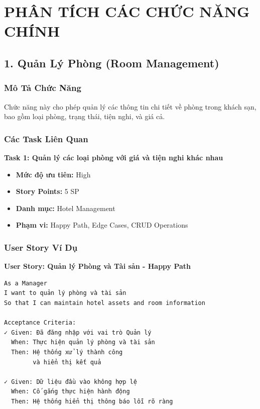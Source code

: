 \documentclass[12pt, a4paper]{report}
\begin{document}
\newpage

\chapter{PHÂN TÍCH CÁC CHỨC NĂNG CHÍNH}

\section{1. Quản Lý Phòng (Room Management)}

\subsection{Mô Tả Chức Năng}

Chức năng này cho phép quản lý các thông tin chi tiết về phòng trong khách sạn, bao gồm loại phòng, trạng thái, tiện nghi, và giá cả.

\subsection{Các Task Liên Quan}

\begin{tcolorbox}[colback=blue!5, colframe=blue!50]
\textbf{Task 1: Quản lý các loại phòng với giá và tiện nghi khác nhau}
\begin{itemize}
    \item \textbf{Mức độ ưu tiên:} High
    \item \textbf{Story Points:} 5 SP
    \item \textbf{Danh mục:} Hotel Management
    \item \textbf{Phạm vi:} Happy Path, Edge Cases, CRUD Operations
\end{itemize}
\end{tcolorbox}

\subsection{User Story Ví Dụ}

\begin{tcolorbox}[colback=green!5, colframe=green!50]
\textbf{User Story: Quản lý Phòng và Tài sản - Happy Path}

\begin{lstlisting}
As a Manager
I want to quản lý phòng và tài sản 
So that I can maintain hotel assets and room information

Acceptance Criteria:
✓ Given: Đã đăng nhập với vai trò Quản lý
  When: Thực hiện quản lý phòng và tài sản
  Then: Hệ thống xử lý thành công 
        và hiển thị kết quả

✓ Given: Dữ liệu đầu vào không hợp lệ
  When: Cố gắng thực hiện hành động
  Then: Hệ thống hiển thị thông báo lỗi rõ ràng
\end{lstlisting}
\end{tcolorbox}
\end{document}
